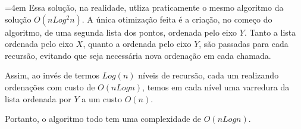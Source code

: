 \documentclass[10pt,a4paper]{letter}
\newenvironment{resposta}{%
  \par%
  \medskip
  \leftskip=4em%
  \noindent\ignorespaces}{%
  \par\medskip}
\begin{document}
\par 
\begin{resposta}
Essa solução, na realidade, utliza praticamente o mesmo algoritmo da solução $O(nLog^2n)$. A única otimização feita é a criação, no começo do algoritmo, de uma segunda lista dos pontos, ordenada pelo eixo $Y$. Tanto a lista ordenada pelo eixo $X$, quanto a ordenada pelo eixo $Y$, são passadas para cada recursão, evitando que seja necessária nova ordenação em cada chamada.
\par 
Assim, ao invés de termos $Log(n)$ níveis de recursão, cada um realizando ordenações com custo de $O(nLogn)$, temos em cada nível uma varredura da lista ordenada por $Y$ a um custo $O(n)$.
\par 
Portanto, o algoritmo todo tem uma complexidade de $O(nLogn)$.
\end{resposta}
\end{document}
